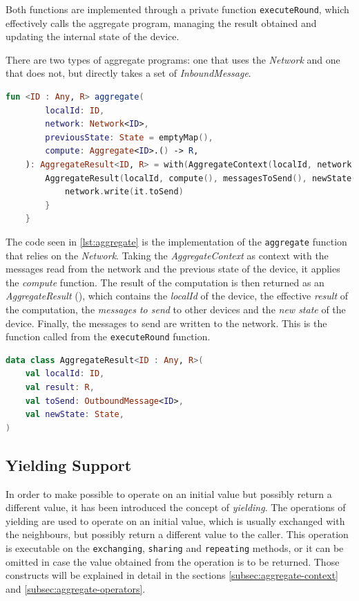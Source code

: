 Both functions are implemented through a private function \texttt{executeRound}, which effectively calls the aggregate program,
managing the result obtained and updating the internal state of the device.

There are two types of aggregate programs: one that uses the \emph{Network} and one that does not, but directly takes
a set of \emph{InboundMessage}.

\begin{lstlisting}[language=kt,label={lst:aggregate}, caption={The signature of the \texttt{aggregate program}.}]
fun <ID : Any, R> aggregate(
        localId: ID,
        network: Network<ID>,
        previousState: State = emptyMap(),
        compute: Aggregate<ID>.() -> R,
    ): AggregateResult<ID, R> = with(AggregateContext(localId, network.read(), previousState)) {
        AggregateResult(localId, compute(), messagesToSend(), newState()).also {
            network.write(it.toSend)
        }
    }
\end{lstlisting}

The code seen in \ref{lst:aggregate} is the implementation of the \texttt{aggregate} function that relies on the \emph{Network}.
Taking the \emph{AggregateContext} as context with the messages read from the network and the previous state of the
device, it applies the \emph{compute} function.
The result of the computation is then returned as an \emph{AggregateResult} (), which contains the \emph{localId} of the device,
the effective \emph{result} of the computation, the \emph{messages to send} to other devices and the \emph{new state} of the device.
Finally, the messages to send are written to the network.
This is the function called from the \texttt{executeRound} function.

\begin{lstlisting}[language=kt,label={lst:aggregateresult}, caption={The signature of the \texttt{aggregate result}.}]
data class AggregateResult<ID : Any, R>(
    val localId: ID,
    val result: R,
    val toSend: OutboundMessage<ID>,
    val newState: State,
)
\end{lstlisting}

\subsection{Yielding Support}
\label{subsec:yielding-support}
In order to make possible to operate on an initial value but possibly return a different value, it has been introduced
the concept of \emph{yielding}.
The operations of yielding are used to operate on an initial value, which is usually exchanged with the neighbours,
but possibly return a different value to the caller.
This operation is executable on the \texttt{exchanging}, \texttt{sharing} and \texttt{repeating} methods, or it can be omitted
in case the value obtained from the operation is to be returned.
Those constructs will be explained in detail in the sections \ref{subsec:aggregate-context} and \ref{subsec:aggregate-operators}.

